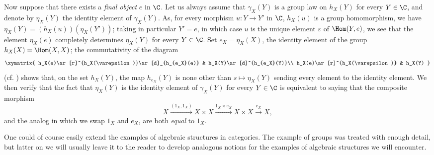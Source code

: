 \begin{env}[8.2.7]
\label{0.8.2.7}
Now suppose that there exists a \emph{final object} $e$  in $\C$.
Let us always assume that $\gamma_X(Y)$ is a group law on $h_X(Y)$ for every $Y\in\C$, and denote by $\eta_X(Y)$ the identity element of $\gamma_X(Y)$.
As, for every morphism $u:Y\to Y'$ in $\C$, $h_X(u)$ is a group homomorphism, we have $\eta_X(Y)=(h_X(u))(\eta_X(Y'))$; taking in particular $Y'=e$, in which case $u$ is the unique element $\varepsilon$ of $\Hom(Y,e)$, we see that the element $\eta_X(e)$ completely determines $\eta_X(Y)$ for every $Y\in\C$.
Set $e_X=\eta_X(X)$, the identity element of the group $h_X(X)=\Hom(X,X)$; the commutativity of the diagram
\[
  \xymatrix{
    h_X(e)\ar[r]^{h_X(\varepsilon)}\ar[d]_{h_{e_X}(e)} &
    h_X(Y)\ar[d]^{h_{e_X}(Y)}\\
    h_X(e)\ar[r]^{h_X(\varepsilon)} &
    h_X(Y)
  }
\]
(cf. ) shows that, on the set $h_X(Y)$, the map $h_{e_X}(Y)$ is none other than
$s\mapsto\eta_X(Y)$ sending every element to the identity element.
We then verify that the fact that $\eta_X(Y)$ is the identity element of $\gamma_X(Y)$ for every $Y\in\C$ is equivalent to saying that the composite morphism
\[
  X\xrightarrow{(1_X,1_X)}X\times X\xrightarrow{1_X\times e_X}X\times X\xrightarrow{c_X}X,
\]
and the analog in which we swap $1_X$ and $e_X$, are both \emph{equal} to $1_X$.
\end{env}

\begin{env}[8.2.8]
\label{0.8.2.8}
One could of course easily extend the examples of algebraic structures in categories.
The example of groups was treated with enough detail, but latter on we will usually leave it to the reader to develop analogous notions for the examples of algebraic structures we will encounter.
\end{env}

